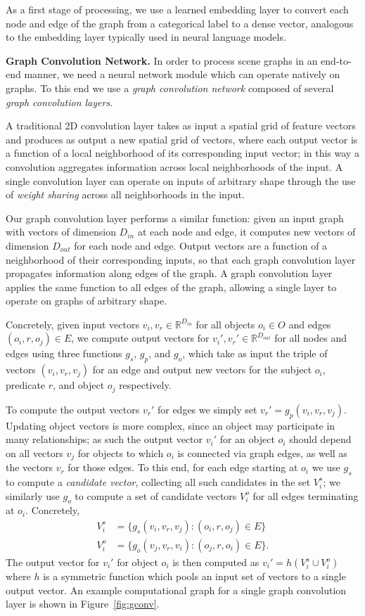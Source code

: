 \documentclass[10pt,twocolumn,letterpaper]{article}
\newcommand{\RR}{\mathbb{R}}
\begin{document}
As a first stage of processing, we use a learned embedding layer to convert
each node and edge of the graph from a categorical label to a dense vector,
analogous to the embedding layer typically used in neural language models.


\textbf{Graph Convolution Network.}
In order to process scene graphs in an end-to-end manner, we need a neural
network module which can operate natively on graphs. To this end we use a
\emph{graph convolution network} composed of several \emph{graph convolution
layers}.

A traditional 2D convolution layer takes as input a spatial grid of feature vectors
and produces as output a new spatial grid of vectors, where each output vector is a
function of a local neighborhood of its corresponding input vector; in this way a
convolution aggregates information across local neighborhoods of the input. A single
convolution layer can operate on inputs of arbitrary shape through the use of
\emph{weight sharing} across all neighborhoods in the input.

Our graph convolution layer performs a similar function: given an input graph with
vectors of dimension $D_{in}$ at each node and edge, it computes new vectors of
dimension $D_{out}$ for each node and edge. Output vectors are a function of a
neighborhood of their corresponding inputs, so that each graph convolution layer
propagates information along edges of the graph. A graph convolution layer applies
the same function to all edges of the graph, allowing a single layer to operate on
graphs of arbitrary shape.

Concretely, given input vectors $v_i,v_r\in\RR^{D_{in}}$ for all objects $o_i\in O$ and
edges $(o_i, r, o_j)\in E$, we compute output vectors for $v_i',v_r'\in\RR^{D_{out}}$
for all nodes and edges using three functions $g_s$, $g_p$, and $g_o$, which
take as input the triple of vectors $(v_i, v_r, v_j)$ for an edge and output new vectors
for the subject $o_i$, predicate $r$, and object $o_j$ respectively.

To compute the output vectors $v_r'$ for edges we simply set $v_r'=g_p(v_i,v_r,v_j)$.
Updating object vectors is more complex, since an object may participate in
many relationships; as such the output vector $v_i'$ for an object $o_i$ should depend
on all vectors $v_j$ for objects to which $o_i$ is connected via graph edges, as well
as the vectors $v_r$ for those edges. To this end, for each edge starting at $o_i$
we use $g_s$ to compute a \emph{candidate vector}, collecting all such candidates in
the set $V_i^s$; we similarly use $g_o$ to compute a set of candidate vectors $V_i^o$
for all edges terminating at $o_i$. Concretely,
\begin{align}
  V_i^s &= \{g_s(v_i, v_r, v_j) : (o_i, r, o_j) \in E\} \\
  V_i^o &= \{g_o(v_j, v_r, v_i) : (o_j, r, o_i) \in E\}.
\end{align}
The output vector for $v_i'$ for object $o_i$ is then computed as
$v_i'=h(V_i^s\cup V_i^o)$ where $h$ is a symmetric function which pools an input set of
vectors to a single output vector. An example computational graph for a single graph
convolution layer is shown in Figure~\ref{fig:gconv}.
\end{document}

